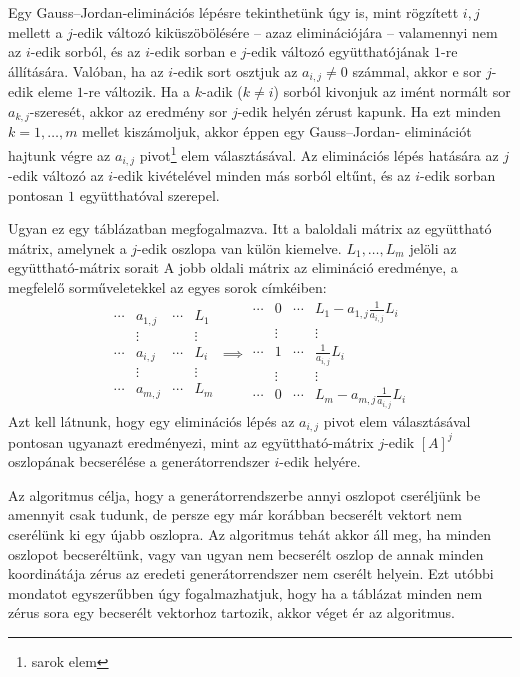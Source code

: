 \documentclass[9pt, a4paper, showtrims]{memoir}
\theoremstyle{plain}
\theoremstyle{remark}
\theoremstyle{definition}
\begin{document}
Egy Gauss--Jordan-eliminációs  lépésre tekinthetünk úgy is,
mint rögzített $i,j$ mellett a $j$-edik változó kiküszöbölésére
-- azaz eliminációjára -- 
valamennyi nem az $i$-edik sorból,
és az $i$-edik sorban e $j$-edik változó együtthatójának $1$-re állítására.
Valóban,
ha az $i$-edik sort osztjuk az $a_{i,j}\neq 0$ számmal, akkor e sor $j$-edik
eleme $1$-re változik.
Ha a $k$-adik ($k\neq i$) sorból kivonjuk az imént normált sor
$a_{k,j}$-szeresét, akkor az eredmény sor $j$-edik helyén zérust kapunk.
Ha ezt minden $k=1,\dots,m$ mellet kiszámoljuk, akkor éppen egy Gauss--Jordan-%
eliminációt hajtunk végre az $a_{i,j}$ pivot\footnote{sarok elem} elem választásával.
Az eliminációs lépés hatására az $j$-edik változó az $i$-edik kivételével
minden más sorból eltűnt, és az $i$-edik sorban pontosan $1$ együtthatóval szerepel.

Ugyan ez egy táblázatban megfogalmazva. 
Itt a baloldali mátrix az együttható mátrix, amelynek
a $j$-edik oszlopa van külön kiemelve.
$L_1,\dots,L_m$ jelöli az együttható-mátrix sorait
A jobb oldali mátrix az elimináció eredménye, a megfelelő sorműveletekkel az egyes sorok
címkéiben:
\[
    \begin{array}{ccc|c}
        \cdots&a_{1,j}&\cdots&L_1\\
        &\vdots&       &\vdots\\
        \cdots&\boxed{a_{i,j}}&\cdots&L_i\\
        &\vdots&       &\vdots\\
        \cdots&a_{m,j}&\cdots&L_m
    \end{array}
    \implies
    \begin{array}{ccc|c}
        \cdots&0&\cdots&L_1-a_{1,j}\frac{1}{a_{i,j}}L_i\\
        &\vdots&       &\vdots\\
        \cdots&1&\cdots&\frac{1}{a_{i,j}}L_i\\
        &\vdots&       &\vdots\\
        \cdots&0&\cdots&L_m-a_{m,j}\frac{1}{a_{i,j}}L_i
    \end{array}
\]
Azt kell látnunk, hogy egy eliminációs lépés az $a_{i,j}$ pivot elem választásával pontosan ugyanazt eredményezi, 
mint az együttható-mátrix $j$-edik $\left[ A \right]^j$ oszlopának becserélése a generátorrendszer $i$-edik helyére. 

Az algoritmus célja, hogy
a generátorrendszerbe annyi oszlopot cseréljünk be amennyit csak tudunk, 
de persze egy már korábban becserélt vektort nem cserélünk ki egy újabb oszlopra.
Az algoritmus tehát akkor áll meg,
ha minden oszlopot becseréltünk, 
vagy van ugyan nem becserélt oszlop de annak minden koordinátája zérus az eredeti generátorrendszer nem cserélt helyein.
Ezt utóbbi mondatot egyszerűbben úgy fogalmazhatjuk, 
hogy ha a táblázat minden nem zérus sora egy becserélt vektorhoz tartozik,
akkor véget ér az algoritmus.
\end{document}
